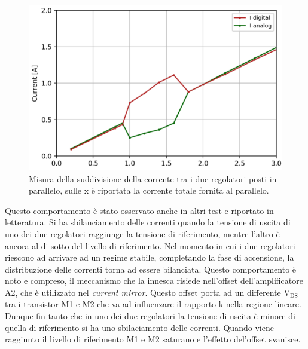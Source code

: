% 
%

\begin{figure}
\centering
\includegraphics[scale=.4]{Immagini/CurrentSharing}
\caption{Misura della suddivisione della corrente tra i due regolatori posti in parallelo, sulle x è riportata la corrente totale fornita al parallelo.}%
\label{CurrentSharing}
\end{figure}
Questo comportamento è stato osservato anche in altri test e riportato in letteratura\cite{SLDO}. 
Si ha sbilanciamento delle correnti quando  la tensione di uscita di uno dei due regolatori raggiunge la tensione di riferimento, mentre l'altro è ancora al di sotto del livello di riferimento. 
Nel momento in cui i due regolatori riescono ad arrivare ad un regime stabile, completando la fase di accensione, la distribuzione delle correnti torna ad essere bilanciata. 
Questo comportamento è noto e compreso, il meccanismo che la innesca risiede nell'offset dell'amplificatore A2, che è utilizzato nel \textit{current mirror}. 
Questo offset porta ad un differente $\mathrm{V_{DS}}$ tra i transistor M1 e M2 che va ad influenzare il rapporto k nella regione lineare. Dunque fin tanto che in uno dei due regolatori la tensione di uscita è minore di quella di riferimento si ha uno sbilaciamento delle correnti. 
Quando viene raggiunto il livello di riferimento M1 e M2 saturano e l'effetto del'offset svanisce.

